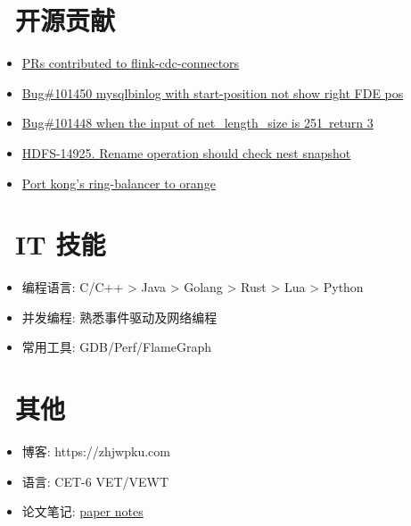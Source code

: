 \documentclass{resume}
\begin{document}
\section{\faCodeFork\ 开源贡献}
\begin{onehalfspacing}
  \begin{itemize}
    \item \href{https://github.com/ververica/flink-cdc-connectors/pulls?q=is%3Apr+author%3Azhjwpku+}{PRs contributed to flink-cdc-connectors}
    \item \href{https://github.com/mysql/mysql-server/pull/313}{Bug\#101450 mysqlbinlog with start-position not show right FDE pos}
    \item \href{https://github.com/mysql/mysql-server/pull/311}{Bug\#101448 when the input of net\_length\_size is 251\, return 3}
    \item \href{https://github.com/apache/hadoop/pull/1670/files}{HDFS-14925. Rename operation should check nest snapshot}
    \item \href{https://github.com/orlabs/orange/pull/138}{Port kong's ring-balancer to orange}
  \end{itemize}
  \end{onehalfspacing}

\section{\faWrench\ IT 技能}
\begin{itemize}[parsep=0.5ex]
  \item 编程语言:  C/C++ > Java > Golang > Rust > Lua > Python
  \item 并发编程: 熟悉事件驱动及网络编程
  \item 常用工具: GDB/Perf/FlameGraph
\end{itemize}

\section{\faCogs\ 其他}
\begin{itemize}[parsep=0.5ex]
  \item 博客: https://zhjwpku.com
  \item 语言: CET-6 VET/VEWT
  \item 论文笔记: \href{https://paper-notes.zhjwpku.com/}{paper notes}
\end{itemize}
\end{document}
